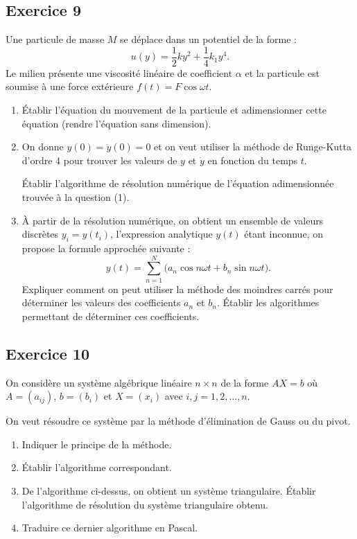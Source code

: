 \subsection*{Exercice 9}

Une particule de masse $M$ se déplace dans un potentiel de la forme :
\[
  u(y) = \frac{1}{2}ky^2 + \frac{1}{4}k_1y^4 .
\]
Le milieu présente une viscosité linéaire de coefficient $\alpha$ et la
particule est soumise à une force extérieure $f(t) = F\cos\omega t$.
\begin{enumerate}[label=\arabic*)-]
  \item Établir l'équation du mouvement de la particule et adimensionner cette
        équation (rendre l'équation sans dimension).
  \item On donne $y(0) = \dot{y}(0) = 0$ et on veut utiliser la méthode de
        Runge-Kutta d'ordre 4 pour trouver les valeurs de $y$ et $\dot{y}$ en
        fonction du temps $t$.

        Établir l'algorithme de résolution numérique de l'équation
        adimensionnée trouvée à la question (1).
  \item À partir de la résolution numérique, on obtient un ensemble de valeurs
        discrètes $y_i = y(t_i)$, l'expression analytique $y(t)$ étant
        inconnue, on propose la formule approchée suivante :
        \[
          y(t) = \sum_{n=1}^{N}\bigl(a_n\cos n\omega t + b_n\sin n\omega t\bigr).
        \]
        Expliquer comment on peut utiliser la méthode des moindres carrés pour
        déterminer les valeurs des coefficients $a_n$ et $b_n$. Établir les
        algorithmes permettant de déterminer ces coefficients.
\end{enumerate}

\subsection*{Exercice 10}

On considère un système algébrique linéaire $n \times n$ de la forme $AX = b$
où $A = (a_{ij})$, $b = (b_i)$ et $X = (x_i)$ avec $i, j = 1, 2, \dots, n$.

On veut résoudre ce système par la méthode d'élimination de Gauss ou du
pivot.
\begin{enumerate}[label=\arabic*-]
  \item Indiquer le principe de la méthode.
  \item Établir l'algorithme correspondant.
  \item De l'algorithme ci-dessus, on obtient un système triangulaire. Établir
        l'algorithme de résolution du système triangulaire obtenu.
  \item Traduire ce dernier algorithme en Pascal.
\end{enumerate}

